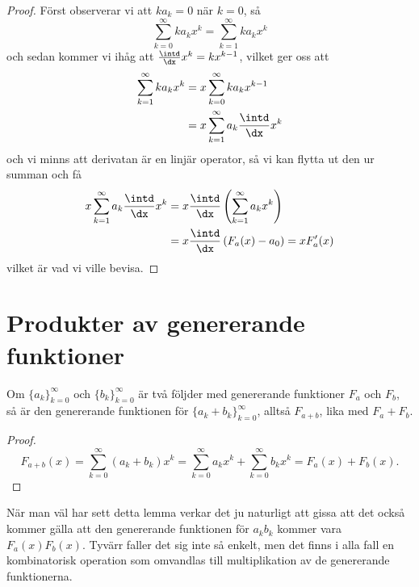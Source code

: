 \documentclass[nobib]{tufte-handout}
\begin{document}
\begin{lemma}
\begin{proof}
        Först observerar vi att $ka_k=0$ när $k=0$, så
        $$\sum_{k=0}^{\infty} k a_k x^k = \sum_{k=1}^{\infty} k a_k x^k$$
        och sedan kommer vi ihåg att $\frac{\intd}{\dx} x^{k} = k x^{k-1}$, vilket ger oss att
        \begin{align*}
            \sum_{k=1}^{\infty} k a_k x^k &= x\sum_{k=0}^{\infty} k a_k x^{k-1}\\
            &= x\sum_{k=1}^{\infty} a_k \frac{\intd}{\dx} x^k
        \end{align*}
        och vi minns att derivatan är en linjär operator, så vi kan flytta ut den ur summan och få
        \begin{align*}
            x\sum_{k=1}^{\infty} a_k \frac{\intd}{\dx} x^k &= x\frac{\intd}{\dx} \left(\sum_{k=1}^{\infty} a_k x^k\right)\\
            &= x\frac{\intd}{\dx}\left(F_a(x) - a_0\right) = xF_a'(x)
        \end{align*}
        vilket är vad vi ville bevisa.
    \end{proof}
\end{lemma}

\section{Produkter av genererande funktioner}

\begin{lemma}
    Om $\{a_k\}_{k=0}^\infty$ och $\{b_k\}_{k=0}^\infty$ är två följder med genererande funktioner $F_a$ och $F_b$, så är den genererande funktionen för $\{a_k + b_k\}_{k=0}^\infty$, alltså $F_{a + b}$, lika med $F_a + F_b$.
    \begin{proof}
        $$F_{a + b}(x) = \sum_{k = 0}^{\infty} (a_k + b_k)x^k = \sum_{k = 0}^{\infty} a_k x^k + \sum_{k = 0}^{\infty} b_k x^k = F_a(x) + F_b(x).$$
    \end{proof}
\end{lemma}

När man väl har sett detta lemma verkar det ju naturligt att gissa att det också kommer gälla att den genererande funktionen för $a_k b_k$ kommer vara $F_a(x)F_b(x)$. Tyvärr faller det sig inte så enkelt, men det finns i alla fall en kombinatorisk operation som omvandlas till multiplikation av de genererande funktionerna.
\end{document}
